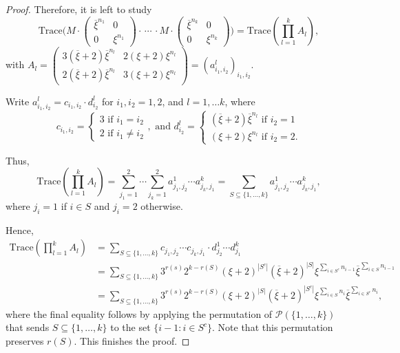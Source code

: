 \documentclass[12pt,reqno]{amsart}
\numberwithin{equation}{part}
\theoremstyle{plain}
\theoremstyle{definition}
\newcommand{\Tr}{\mathrm{Trace}}
\begin{document}
\begin{proof}
Therefore, it is left to study 
\[
\Tr\Bigg(M\cdot \begin{pmatrix}
    \overline{\xi}^{n_1} & 0 \\ 0 & \xi^{n_1} 
\end{pmatrix}\cdot \, \cdots\, \cdot M\cdot \begin{pmatrix}
    \overline{\xi}^{n_k} & 0 \\ 0 & \xi^{n_k} 
\end{pmatrix} \Bigg)=\Tr(\prod_{l=1}^k A_l),
\]
with $A_l=\begin{pmatrix}
    3(\overline{\xi}+2)\overline{\xi}^{n_l} & 2(\xi+2)\xi^{n_l} \\ 2(\overline{\xi}+2)\overline{\xi}^{n_l} & 3(\xi+2)\xi^{n_l} 
\end{pmatrix}=(a_{i_1,i_2}^l)_{i_1,i_2}$.

Write $a_{i_1,i_2}^l=c_{i_1,i_2}\cdot d_{i_2}^l$ for $i_1,i_2=1,2$, and $l=1,\hdots k$,  where 
\[c_{i_1,i_2}=\begin{cases}
    3 \text{ if }i_1=i_2\\
    2 \text{ if }i_1\neq i_2
\end{cases}, \text{ and } d_{i_2}^l=\begin{cases}
    (\overline\xi+2)\overline\xi^{n_l}\text{ if }i_2=1 \\
    (\xi+2)\xi^{n_l}\text{ if }i_2=2.
\end{cases}
\]

Thus, 
\[
\Tr(\prod_{l=1}^k A_l)=\sum_{j_1=1}^2\cdots \sum_{j_k=1}^2 a_{j_1,j_2}^1\cdots a_{j_k,j_1}^k=\sum_{S\subseteq \{1,\hdots,k\}}a_{j_1,j_2}^1\cdots a_{j_k,j_1}^k, 
\]
where $j_i=1$ if $i\in S$ and $j_i=2$ otherwise. 

Hence, 
\begin{align*}
\Tr(\prod_{l=1}^k A_l)&=\sum_{S\subseteq \{1,\hdots,k\}}c_{j_1,j_2}\cdots c_{j_k,j_1}\cdot d_{j_2}^1\cdots d_{j_1}^k\\
&=\sum_{S\subseteq\{1,\hdots,k\}}3^{r(s)}2^{k-r(S)}(\xi+2)^{|S^c|}(\overline\xi+2)^{|S|}\xi^{\sum_{i\in S^c}n_{i-1}}\overline\xi^{\sum_{i\in S}n_{i-1}}\\
&=\sum_{S\subseteq\{1,\hdots,k\}}3^{r(s)}2^{k-r(S)}(\xi+2)^{|S|}(\overline\xi+2)^{|S^c|}\xi^{\sum_{i\in S}n_i}\overline\xi^{\sum_{i\in S^c}n_i},
\end{align*}
where the final equality follows by applying the permutation of $\mathcal{P}(\{1,\hdots,k\})$ that sends $S\subseteq \{1,\hdots,k\}$ to the
set $\{i - 1 : i \in S^c\}$. Note that this permutation preserves $r(S)$. This finishes the proof.
\end{proof}
\end{document}
